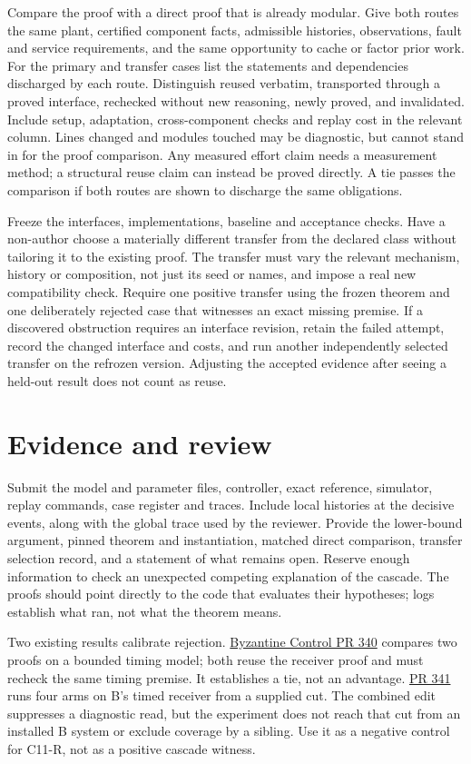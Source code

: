 \documentclass[11pt]{article}
\begin{document}
Compare the proof with a direct proof that is already modular. Give both routes the same plant, certified component facts, admissible histories, observations, fault and service requirements, and the same opportunity to cache or factor prior work. For the primary and transfer cases list the statements and dependencies discharged by each route. Distinguish reused verbatim, transported through a proved interface, rechecked without new reasoning, newly proved, and invalidated. Include setup, adaptation, cross-component checks and replay cost in the relevant column. Lines changed and modules touched may be diagnostic, but cannot stand in for the proof comparison. Any measured effort claim needs a measurement method; a structural reuse claim can instead be proved directly. A tie passes the comparison if both routes are shown to discharge the same obligations.

Freeze the interfaces, implementations, baseline and acceptance checks. Have a non-author choose a materially different transfer from the declared class without tailoring it to the existing proof. The transfer must vary the relevant mechanism, history or composition, not just its seed or names, and impose a real new compatibility check. Require one positive transfer using the frozen theorem and one deliberately rejected case that witnesses an exact missing premise. If a discovered obstruction requires an interface revision, retain the failed attempt, record the changed interface and costs, and run another independently selected transfer on the refrozen version. Adjusting the accepted evidence after seeing a held-out result does not count as reuse.

\section{Evidence and review}

Submit the model and parameter files, controller, exact reference, simulator, replay commands, case register and traces. Include local histories at the decisive events, along with the global trace used by the reviewer. Provide the lower-bound argument, pinned theorem and instantiation, matched direct comparison, transfer selection record, and a statement of what remains open. Reserve enough information to check an unexpected competing explanation of the cascade. The proofs should point directly to the code that evaluates their hypotheses; logs establish what ran, not what the theorem means.

Two existing results calibrate rejection. \href{https://github.com/eternal-november/eos-research-programmes/pull/340}{Byzantine Control PR 340} compares two proofs on a bounded timing model; both reuse the receiver proof and must recheck the same timing premise. It establishes a tie, not an advantage. \href{https://github.com/eternal-november/eos-research-programmes/pull/341}{PR 341} runs four arms on B's timed receiver from a supplied cut. The combined edit suppresses a diagnostic read, but the experiment does not reach that cut from an installed B system or exclude coverage by a sibling. Use it as a negative control for C11-R, not as a positive cascade witness.
\end{document}
